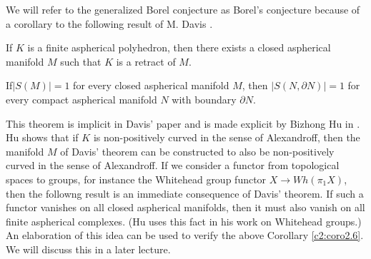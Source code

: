 We will refer to the generalized Borel conjecture as Borel's
conjecture because of a corollary to the following result of M. Davis
\cite{22}.

\setcounter{lemma}{4}
\begin{thm}[Davis]\label{c2:thm2.5}
  If $K$ is a finite aspherical polyhedron, then there exists a closed
  aspherical manifold $M$ such that $K$ is a retract of $M$.
\end{thm}

\begin{coro}\label{c2:coro2.6}
  If\pageoriginale $|S(M)|=1$ for every closed aspherical manifold
  $M$, then $|S (N, \partial N)|=1$ for every compact aspherical
  manifold $N$ with boundary $\partial N$.
\end{coro}

\begin{remark*}
  This theorem is implicit in Davis' paper \cite{22} and is made
  explicit by Bizhong Hu in \cite{63}. Hu shows that if $K$ is
  non-positively curved in the sense of Alexandroff, then the manifold
  $M$ of Davis' theorem can be constructed to also be non-positively
  curved in the sense of Alexandroff. If we consider a functor from
  topological spaces to groups, for instance the Whitehead group
  functor $X \to Wh (\pi_1 X)$, then the followng result is an
  immediate consequence of Davis' theorem. If such a functor vanishes
  on all closed aspherical manifolds, then it must also vanish on all
  finite aspherical complexes. (Hu uses this fact in his work on
  Whitehead groups.) An elaboration of this idea can be used to verify
  the above Corollary \ref{c2:coro2.6}. We will discuss this in a
  later lecture.
\end{remark*}
